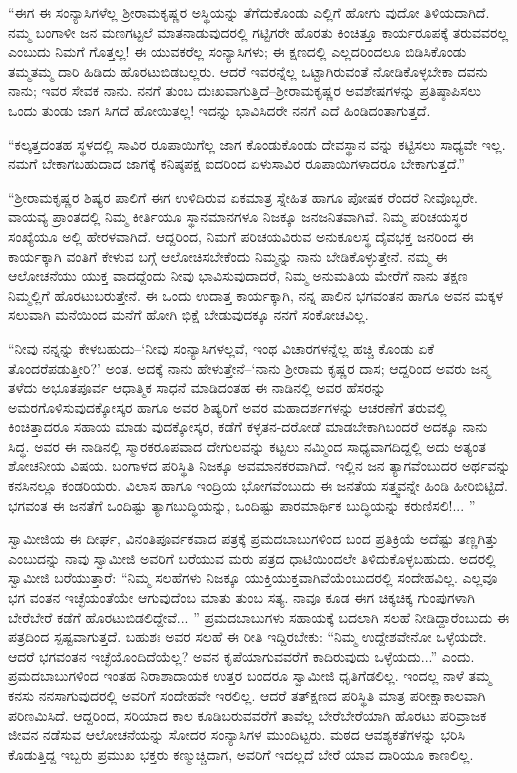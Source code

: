 “ಈಗ ಈ ಸಂನ್ಯಾಸಿಗಳೆಲ್ಲ ಶ್ರೀರಾಮಕೃಷ್ಣರ ಅಸ್ಥಿಯನ್ನು ತೆಗೆದುಕೊಂಡು ಎಲ್ಲಿಗೆ ಹೋಗು ವುದೋ ತಿಳಿಯದಾಗಿದೆ. ನಮ್ಮ ಬಂಗಾಳೀ ಜನ ಮಣಗಟ್ಟಲೆ ಮಾತನಾಡುವುದರಲ್ಲಿ ಗಟ್ಟಿಗರೇ ಹೊರತು ಕಿಂಚಿತ್ತೂ ಕಾರ್ಯರೂಪಕ್ಕೆ ತರುವವರಲ್ಲ ಎಂಬುದು ನಿಮಗೆ ಗೊತ್ತಲ್ಲ! ಈ ಯುವಕರೆಲ್ಲ ಸಂನ್ಯಾಸಿಗಳು; ಈ ಕ್ಷಣದಲ್ಲಿ ಎಲ್ಲದರಿಂದಲೂ ಬಿಡಿಸಿಕೊಂಡು ತಮ್ಮತಮ್ಮ ದಾರಿ ಹಿಡಿದು ಹೊರಟುಬಿಡಬಲ್ಲರು. ಆದರೆ ಇವರನ್ನೆಲ್ಲ ಒಟ್ಟಾಗಿರುವಂತೆ ನೋಡಿಕೊಳ್ಳಬೇಕಾ ದವನು ನಾನು; ಇವರ ಸೇವಕ ನಾನು. ನನಗೆ ತುಂಬ ದುಃಖವಾಗುತ್ತಿದೆ–ಶ್ರೀರಾಮಕೃಷ್ಣರ ಅವಶೇಷಗಳನ್ನು ಪ್ರತಿಷ್ಠಾಪಿಸಲು ಒಂದು ತುಂಡು ಜಾಗ ಸಿಗದೆ ಹೋಯಿತಲ್ಲ! ಇದನ್ನು ಭಾವಿಸಿದರೇ ನನಗೆ ಎದೆ ಹಿಂಡಿದಂತಾಗುತ್ತದೆ.

“ಕಲ್ಕತ್ತದಂತಹ ಸ್ಥಳದಲ್ಲಿ ಸಾವಿರ ರೂಪಾಯಿಗೆಲ್ಲ ಜಾಗ ಕೊಂಡುಕೊಂಡು ದೇವಸ್ಥಾನ ವನ್ನು ಕಟ್ಟಿಸಲು ಸಾಧ್ಯವೇ ಇಲ್ಲ. ನಮಗೆ ಬೇಕಾಗಬಹುದಾದ ಜಾಗಕ್ಕೆ ಕನಿಷ್ಠಪಕ್ಷ ಐದರಿಂದ ಏಳುಸಾವಿರ ರೂಪಾಯಿಗಳಾದರೂ ಬೇಕಾಗುತ್ತದೆ.”

“ಶ್ರೀರಾಮಕೃಷ್ಣರ ಶಿಷ್ಯರ ಪಾಲಿಗೆ ಈಗ ಉಳಿದಿರುವ ಏಕಮಾತ್ರ ಸ್ನೇಹಿತ ಹಾಗೂ ಪೋಷಕ ರೆಂದರೆ ನೀವೊಬ್ಬರೇ. ವಾಯವ್ಯ ಪ್ರಾಂತದಲ್ಲಿ ನಿಮ್ಮ ಕೀರ್ತಿಯೂ ಸ್ಥಾನಮಾನಗಳೂ ನಿಜಕ್ಕೂ ಜನಜನಿತವಾಗಿವೆ. ನಿಮ್ಮ ಪರಿಚಯಸ್ಥರ ಸಂಖ್ಯೆಯೂ ಅಲ್ಲಿ ಹೇರಳವಾಗಿದೆ. ಆದ್ದರಿಂದ, ನಿಮಗೆ ಪರಿಚಯವಿರುವ ಅನುಕೂಲಸ್ಥ ದೈವಭಕ್ತ ಜನರಿಂದ ಈ ಕಾರ್ಯಕ್ಕಾಗಿ ವಂತಿಗೆ ಕೇಳುವ ಬಗ್ಗೆ ಆಲೋಚಿಸಬೇಕೆಂದು ನಿಮ್ಮನ್ನು ನಾನು ಬೇಡಿಕೊಳ್ಳುತ್ತೇನೆ. ನಮ್ಮ ಈ ಆಲೋಚನೆಯು ಯುಕ್ತ ವಾದದ್ದೆಂದು ನೀವು ಭಾವಿಸುವುದಾದರೆ, ನಿಮ್ಮ ಅನುಮತಿಯ ಮೇರೆಗೆ ನಾನು ತಕ್ಷಣ ನಿಮ್ಮಲ್ಲಿಗೆ ಹೊರಟುಬರುತ್ತೇನೆ. ಈ ಒಂದು ಉದಾತ್ತ ಕಾರ್ಯಕ್ಕಾಗಿ, ನನ್ನ ಪಾಲಿನ ಭಗವಂತನ ಹಾಗೂ ಅವನ ಮಕ್ಕಳ ಸಲುವಾಗಿ ಮನೆಯಿಂದ ಮನೆಗೆ ಹೋಗಿ ಭಿಕ್ಷೆ ಬೇಡುವುದಕ್ಕೂ ನನಗೆ ಸಂಕೋಚವಿಲ್ಲ.

“ನೀವು ನನ್ನನ್ನು ಕೇಳಬಹುದು–‘ನೀವು ಸಂನ್ಯಾಸಿಗಳಲ್ಲವೆ, ಇಂಥ ವಿಚಾರಗಳನ್ನೆಲ್ಲ ಹಚ್ಚಿ ಕೊಂಡು ಏಕೆ ತೊಂದರೆಪಡುತ್ತೀರಿ?’ ಅಂತ. ಅದಕ್ಕೆ ನಾನು ಹೇಳುತ್ತೇನೆ–‘ನಾನು ಶ್ರೀರಾಮ ಕೃಷ್ಣರ ದಾಸ; ಆದ್ದರಿಂದ ಅವರು ಜನ್ಮ ತಳೆದು ಅಭೂತಪೂರ್ವ ಆಧಾತ್ಮಿಕ ಸಾಧನೆ ಮಾಡಿದಂತಹ ಈ ನಾಡಿನಲ್ಲಿ ಅವರ ಹೆಸರನ್ನು ಅಮರಗೊಳಿಸುವುದಕ್ಕೋಸ್ಕರ ಹಾಗೂ ಅವರ ಶಿಷ್ಯರಿಗೆ ಅವರ ಮಹಾದರ್ಶಗಳನ್ನು ಆಚರಣೆಗೆ ತರುವಲ್ಲಿ ಕಿಂಚಿತ್ತಾದರೂ ಸಹಾಯ ಮಾಡು ವುದಕ್ಕೋಸ್ಕರ, ಕಡೆಗೆ ಕಳ್ಳತನ-ದರೋಡೆ ಮಾಡಬೇಕಾಗಿಬಂದರೆ ಅದಕ್ಕೂ ನಾನು ಸಿದ್ಧ. ಅವರ ಈ ನಾಡಿನಲ್ಲಿ ಸ್ಮಾರಕರೂಪವಾದ ದೇಗುಲವನ್ನು ಕಟ್ಟಲು ನಮ್ಮಿಂದ ಸಾಧ್ಯವಾಗದಿದ್ದಲ್ಲಿ ಅದು ಅತ್ಯಂತ ಶೋಚನೀಯ ವಿಷಯ. ಬಂಗಾಳದ ಪರಿಸ್ಥಿತಿ ನಿಜಕ್ಕೂ ಅವಮಾನಕರವಾಗಿದೆ. ಇಲ್ಲಿನ ಜನ ತ್ಯಾಗವೆಂಬುದರ ಅರ್ಥವನ್ನು ಕನಸಿನಲ್ಲೂ ಕಂಡರಿಯರು. ವಿಲಾಸ ಹಾಗೂ ಇಂದ್ರಿಯ ಭೋಗವೆಂಬುದು ಈ ಜನತೆಯ ಸತ್ತ್ವವನ್ನೇ ಹಿಂಡಿ ಹೀರಿಬಿಟ್ಟಿದೆ. ಭಗವಂತ ಈ ಜನತೆಗೆ ಒಂದಿಷ್ಟು ತ್ಯಾಗಬುದ್ಧಿಯನ್ನು, ಒಂದಿಷ್ಟು ಪಾರಮಾರ್ಥಿಕ ಬುದ್ಧಿಯನ್ನು ಕರುಣಿಸಲಿ!... ”

ಸ್ವಾಮೀಜಿಯ ಈ ದೀರ್ಘ, ವಿನಂತಿಪೂರ್ವಕವಾದ ಪತ್ರಕ್ಕೆ ಪ್ರಮದಬಾಬುಗಳಿಂದ ಬಂದ ಪ್ರತಿಕ್ರಿಯೆ ಅದೆಷ್ಟು ತಣ್ಣಗಿತ್ತು ಎಂಬುದನ್ನು ನಾವು ಸ್ವಾಮೀಜಿ ಅವರಿಗೆ ಬರೆಯುವ ಮರು ಪತ್ರದ ಧಾಟಿಯಿಂದಲೇ ತಿಳಿದುಕೊಳ್ಳಬಹುದು. ಅದರಲ್ಲಿ ಸ್ವಾಮೀಜಿ ಬರೆಯುತ್ತಾರೆ: “ನಿಮ್ಮ ಸಲಹೆಗಳು ನಿಜಕ್ಕೂ ಯುಕ್ತಿಯುಕ್ತವಾಗಿವೆಯೆಂಬುದರಲ್ಲಿ ಸಂದೇಹವಿಲ್ಲ. ಎಲ್ಲವೂ ಭಗ ವಂತನ ಇಚ್ಛೆಯಂತೆಯೇ ಆಗುವುದೆಂಬ ಮಾತು ತುಂಬ ಸತ್ಯ. ನಾವೂ ಕೂಡ ಈಗ ಚಿಕ್ಕಚಿಕ್ಕ ಗುಂಪುಗಳಾಗಿ ಬೇರೆಬೇರೆ ಕಡೆಗೆ ಹೊರಟುಬಿಡಲಿದ್ದೇವೆ... ” ಪ್ರಮದಬಾಬುಗಳು ಸಹಾಯಕ್ಕೆ ಬದಲಾಗಿ ಸಲಹೆ ನೀಡಿದ್ದಾರೆಂಬುದು ಈ ಪತ್ರದಿಂದ ಸ್ಪಷ್ಟವಾಗುತ್ತದೆ. ಬಹುಶಃ ಅವರ ಸಲಹೆ ಈ ರೀತಿ ಇದ್ದಿರಬೇಕು: “ನಿಮ್ಮ ಉದ್ದೇಶವೇನೋ ಒಳ್ಳೆಯದೇ. ಆದರೆ ಭಗವಂತನ ಇಚ್ಛೆಯೊಂದಿದೆಯೆಲ್ಲ? ಅವನ ಕೃಪೆಯಾಗುವವರೆಗೆ ಕಾದಿರುವುದು ಒಳ್ಳೆಯದು...” ಎಂದು. ಪ್ರಮದಬಾಬುಗಳಿಂದ ಇಂತಹ ನಿರಾಶಾದಾಯಕ ಉತ್ತರ ಬಂದರೂ ಸ್ವಾಮೀಜಿ ಧೃತಿಗೆಡಲಿಲ್ಲ. ಇಂದಲ್ಲ ನಾಳೆ ತಮ್ಮ ಕನಸು ನನಸಾಗುವುದರಲ್ಲಿ ಅವರಿಗೆ ಸಂದೇಹವೇ ಇರಲಿಲ್ಲ. ಆದರೆ ತತ್ಕ್ಷಣದ ಪರಿಸ್ಥಿತಿ ಮಾತ್ರ ಪರೀಕ್ಷಾಕಾಲವಾಗಿ ಪರಿಣಮಿಸಿದೆ. ಆದ್ದರಿಂದ, ಸರಿಯಾದ ಕಾಲ ಕೂಡಿಬರುವವರೆಗೆ ತಾವೆಲ್ಲ ಬೇರೆಬೇರೆಯಾಗಿ ಹೊರಟು ಪರಿವ್ರಾಜಕ ಜೀವನ ನಡೆಸುವ ಆಲೋಚನೆಯನ್ನು ಸೋದರ ಸಂನ್ಯಾಸಿಗಳ ಮುಂದಿಟ್ಟರು. ಮಠದ ಆವಶ್ಯಕತೆಗಳನ್ನು ಭರಿಸಿ ಕೊಡುತ್ತಿದ್ದ ಇಬ್ಬರು ಪ್ರಮುಖ ಭಕ್ತರು ಕಣ್ಮುಚ್ಚಿದಾಗ, ಅವರಿಗೆ ಇದಲ್ಲದೆ ಬೇರೆ ಯಾವ ದಾರಿಯೂ ಕಾಣಲಿಲ್ಲ.

